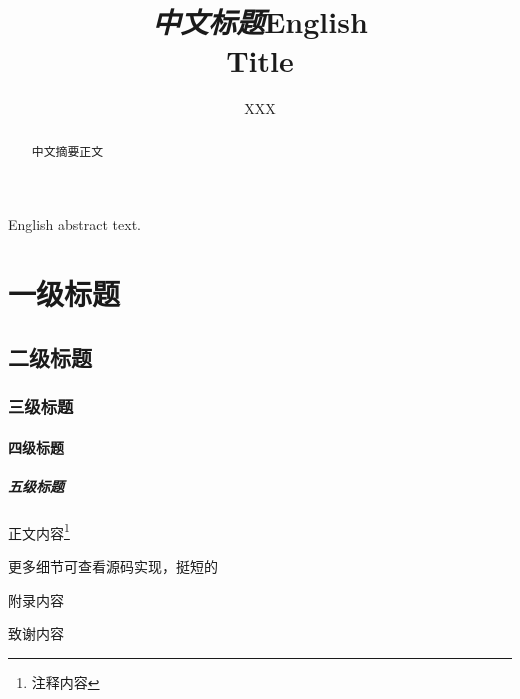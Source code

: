 \documentclass{nkuthesis-ug}
\title{\emph{中文标题}}
\title*{\large English \\ Title} %
\author{XXX}
\begin{document}

\maketitle
\declaration
\begin{abstract}
中文摘要正文
\end{abstract}
\begin{abstract*}
English abstract text.
\end{abstract*}
\tableofcontents


\section{一级标题}
\subsection{二级标题}
\subsubsection{三级标题}
\paragraph{四级标题}
\subparagraph{五级标题}
正文内容\footnote{注释内容}

更多细节可查看源码实现，挺短的

\appendix %
附录内容

% 

\begin{acknowledgement}
致谢内容
\end{acknowledgement}
\end{document}
